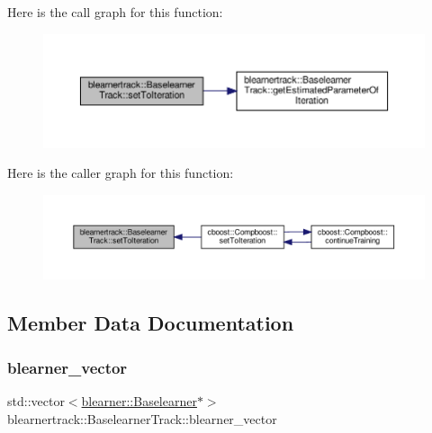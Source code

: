 Here is the call graph for this function\+:\nopagebreak
\begin{figure}[H]
\begin{center}
\leavevmode
\includegraphics[width=350pt]{classblearnertrack_1_1_baselearner_track_a06f0ac986a158eecddce64e6c7af0750_cgraph}
\end{center}
\end{figure}
Here is the caller graph for this function\+:\nopagebreak
\begin{figure}[H]
\begin{center}
\leavevmode
\includegraphics[width=350pt]{classblearnertrack_1_1_baselearner_track_a06f0ac986a158eecddce64e6c7af0750_icgraph}
\end{center}
\end{figure}


\subsection{Member Data Documentation}
\mbox{\label{classblearnertrack_1_1_baselearner_track_ad37a3a99c04778146256e50c44f2a292}} 
\subsubsection{\texorpdfstring{blearner\+\_\+vector}{blearner\_vector}}
{\footnotesize\ttfamily std\+::vector$<$\hyperlink{classblearner_1_1_baselearner}{blearner\+::\+Baselearner}$\ast$$>$ blearnertrack\+::\+Baselearner\+Track\+::blearner\+\_\+vector\hspace{0.3cm}{\ttfamily [private]}}

